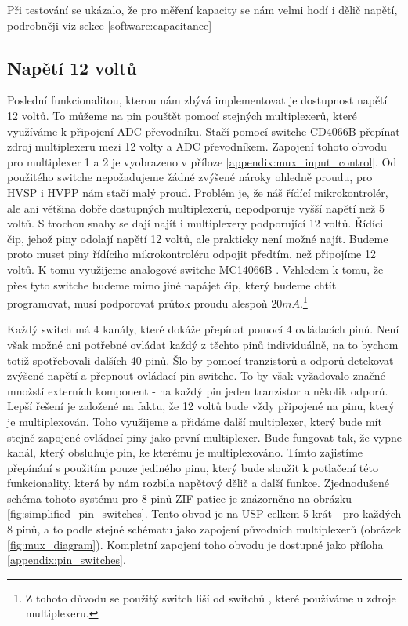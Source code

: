 \documentclass[11pt,a4paper,twoside,openright]{report}
\begin{document}
Při testování se ukázalo, že pro měření kapacity se nám velmi hodí i dělič napětí, podrobněji viz sekce \ref{software:capacitance}

\subsection {Napětí 12 voltů\label{12v}}

Poslední funkcionalitou, kterou nám zbývá implementovat je dostupnost napětí 12 voltů. To můžeme na pin pouštět pomocí stejných multiplexerů, které využíváme k připojení ADC převodníku. Stačí pomocí switche CD4066B \cite{switch2} přepínat zdroj multiplexeru mezi 12 volty a ADC převodníkem. Zapojení tohoto obvodu pro multiplexer 1 a 2 je vyobrazeno v příloze  \ref{appendix:mux_input_control}. Od použitého switche nepožadujeme žádné zvýšené nároky ohledně proudu, pro HVSP i HVPP nám stačí malý proud. Problém je, že náš řídící mikrokontrolér, ale ani většina dobře dostupných multiplexerů, nepodporuje vyšší napětí než 5 voltů. S trochou snahy se dají najít i multiplexery podporující 12 voltů. Řídíci čip, jehož piny odolají napětí 12 voltů, ale prakticky není možné najít. Budeme proto muset piny řídíciho mikrokontroléru odpojit předtím, než připojíme 12 voltů. K tomu využijeme analogové switche MC14066B \cite{switch1}. Vzhledem k tomu, že přes tyto switche budeme mimo jiné napájet čip, který budeme chtít programovat, musí podporovat průtok proudu alespoň $20mA$.\footnote{Z tohoto důvodu se použitý switch liší od switchů \cite{switch2}, které používáme u zdroje multiplexeru.} 

Každý switch má 4 kanály, které dokáže přepínat pomocí 4 ovládacích pinů. Není však možné ani potřebné ovládat každý z těchto pinů individuálně, na to bychom totiž spotřebovali dalších 40 pinů. Šlo by pomocí tranzistorů a odporů detekovat zvýšené napětí a přepnout ovládací pin switche. To by však vyžadovalo značné množstí externích komponent - na každý pin jeden tranzistor a několik odporů. Lepší řešení je založené na faktu, že 12 voltů bude vždy připojené na pinu, který je multiplexován. Toho využijeme a přidáme další multiplexer, který bude mít stejně zapojené ovládací piny jako první multiplexer. Bude fungovat tak, že vypne kanál, který obsluhuje pin, ke kterému je multiplexováno. Tímto zajistíme přepínání s použitím pouze jediného pinu, který bude sloužit k potlačení této funkcionality, která by nám rozbila napětový dělič a další funkce. Zjednodušené schéma tohoto systému pro 8 pinů ZIF patice je znázorněno na obrázku \ref{fig:simplified_pin_switches}. Tento obvod je na USP celkem 5 krát - pro každých 8 pinů, a to podle stejné schématu jako zapojení původních multiplexerů (obrázek \ref{fig:mux_diagram}). Kompletní zapojení toho obvodu je dostupné jako příloha \ref{appendix:pin_switches}.
\end{document}
